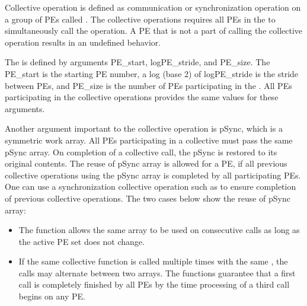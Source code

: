 
Collective operation is defined as communication or synchronization operation 
on a group of \ac{PE}s called \activeset{}. The collective operations requires all
\ac{PE}s in the \activeset{} to simultaneously call the operation. 
A \ac{PE} that is not a part of \activeset{} calling the collective 
operation results in an undefined behavior.

The \activeset{} is defined by arguments PE\_start, logPE\_stride, 
and PE\_size. The PE\_start is the starting \ac{PE} number, a log (base 2) of logPE\_stride 
is the stride between \ac{PE}s, and PE\_size is the number of \ac{PE}s 
participating in the \activeset{}. All \ac{PE}s participating in the 
collective operations provides the same values for these arguments. 
 
Another argument important to the collective operation is pSync, which is a symmetric work 
array. All \ac{PE}s participating in a collective must pass the same
pSync array. On completion of a collective call, the pSync is restored to its 
original contents. The reuse of pSync array is allowed for a \ac{PE}, if all previous collective 
operations using the pSync array is completed by all participating 
\ac{PE}s. One can use a synchronization collective operation such as \barrier{}
to ensure completion of previous collective operations. The two cases below
show the reuse of pSync array:

\begin{itemize}
\item The  function allows the same  array to be used
          on consecutive calls as long as the active \ac{PE} set does not change.
\item  If the same collective function is called multiple times with the
          same \activeset, the calls may alternate between two  arrays.
          The \openshmem functions guarantee that a first call is completely finished by 
          all \ac{PE}s by the time processing of a third  call  begins  on
          any \ac{PE}.          
\end{itemize}


